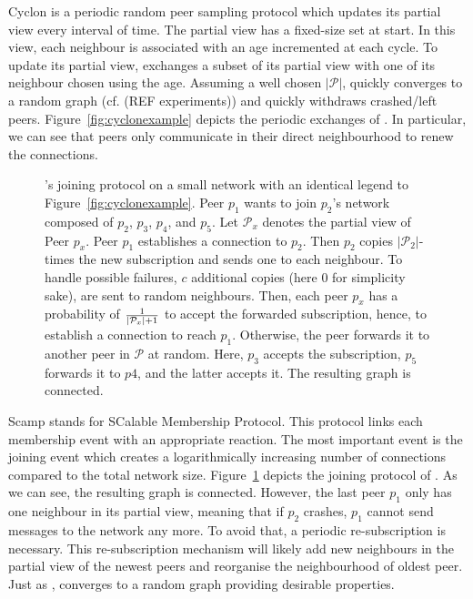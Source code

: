 \begin{asparadesc}
\item [Cyclon]\cite{voulgaris2005cyclon} is a periodic random peer sampling
  protocol which updates its partial view every interval of time. The partial
  view has a fixed-size set at start. In this view, each neighbour is
  associated with an age incremented at each cycle. To update its partial view,
  \CYCLON{} exchanges a subset of its partial view with one of its neighbour
  chosen using the age.  Assuming a well chosen $|\mathcal{P}|$, \CYCLON{}
  quickly converges to a random graph (cf. (REF experiments)) and quickly
  withdraws crashed/left peers.  Figure~\ref{fig:cyclonexample} depicts the
  periodic exchanges of \CYCLON{}. In particular, we can see that peers only
  communicate in their direct neighbourhood to renew the connections.
\end{asparadesc}

\begin{figure}
  \centering
  
  \caption{\label{fig:scampexample} \SCAMP{}'s joining protocol on a small
    network with an identical legend to Figure~\ref{fig:cyclonexample}. Peer
    $p_1$ wants to join $p_2$'s network composed of $p_2$, $p_3$, $p_4$, and
    $p_5$. Let $\mathcal{P}_x$ denotes the partial view of Peer $p_x$. Peer
    $p_1$ establishes a connection to $p_2$. Then $p_2$ copies
    $|\mathcal{P}_2|$-times the new subscription and sends one to each
    neighbour. To handle possible failures, $c$ additional copies (here $0$ for
    simplicity sake), are sent to random neighbours. Then, each peer $p_x$ has
    a probability of $1\over{|\mathcal{P}_x|+1}$ to accept the forwarded
    subscription, hence, to establish a connection to reach $p_1$. Otherwise,
    the peer forwards it to another peer in $\mathcal{P}$ at random. Here,
    $p_3$ accepts the subscription, $p_5$ forwards it to $p4$, and the latter
    accepts it. The resulting graph is connected.}
\end{figure}

\begin{asparadesc}
\item [Scamp]\cite{ganesh2001scamp,ganesh2003peer} stands for SCalable
  Membership Protocol. This protocol links each membership event with an
  appropriate reaction.  The most important event is the joining event which
  creates a logarithmically increasing number of connections compared to the
  total network size.  Figure~\ref{fig:scampexample} depicts the joining
  protocol of \SCAMP{}. As we can see, the resulting graph is
  connected. However, the last peer $p_1$ only has one neighbour in its partial
  view, meaning that if $p_2$ crashes, $p_1$ cannot send messages to the
  network any more. To avoid that, a periodic re-subscription is
  necessary. This re-subscription mechanism will likely add new neighbours in
  the partial view of the newest peers and reorganise the neighbourhood of
  oldest peer. Just as \CYCLON{}, \SCAMP{} converges to a random graph
  providing desirable properties.
\end{asparadesc}

